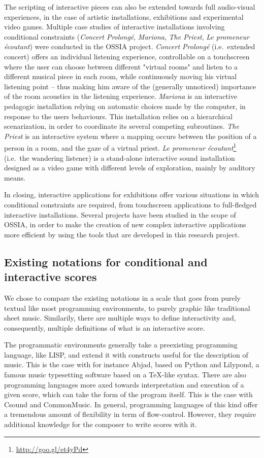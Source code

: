 \documentclass{article}
\begin{document}
	The scripting of interactive pieces can also be extended towards full audio-visual experiences, in the case of artistic installations, exhibitions and  experimental video games.
	Multiple case studies of interactive installations involving conditional constraints (\emph{Concert Prolongé}, \emph{Mariona}, \emph{The Priest}, \emph{Le promeneur écoutant}) were conducted in the OSSIA pro\-ject.
	\emph{Concert Prolongé} (i.e.~extended concert) offers an individual listening experience, controllable on a touchscreen where the user can choose between different "virtual rooms" and listen to a different musical piece in each room, while continuously moving his virtual listening point -- thus making him aware of the (generally unnoticed) importance of the room acoustics in the listening experience.
	\emph{Mariona}\cite[section 7.5.3]{mauricio2012structured} is an interactive pedagogic installation relying on automatic choices made by the computer, in response to the users behaviours. This installation relies on a hier\-archical scenarization, in order to coordinate its several competing subroutines.
	\emph{The Priest} is an interactive system where a mapping occurs between the position of a person in a room, and the gaze of a virtual priest.
	\emph{Le promeneur écoutant}\footnote{\href{http://goo.gl/et4yPd}{http://goo.gl/et4yPd}} (i.e.~the wandering listener) is a stand-alone interactive sound installation designed as a video game with different levels of exploration, mainly by auditory means.
	
	In closing, interactive applications for exhibitions offer various situations in which conditional constraints are required, from touchscreen applications to full-fledged interactive installations. Several projects have been studied in the scope of OSSIA, in order to make the creation of new complex interactive applications more efficient by using the tools that are developed in this research project.
	\subsection{Existing notations for conditional and interactive scores}
	We chose to compare the existing notations in a scale that goes from purely textual like most programming environments, to purely graphic like traditional sheet music. Similarily, there are multiple ways to define interactivity and, consequently, multiple definitions of what is an interactive score.
	
    The programmatic environments generally take a preexisting programming language, like LISP, and extend it with constructs useful for the description of music. This is the case with for instance Abjad\cite{adan2011abjad}, based on Python and Lilypond, a famous music typesetting software based on a \TeX-like syntax. 
    There are also programming languages more axed towards interpretation and execution of a given score, which can take the form of the program itself. This is the case with Csound and CommonMusic\cite{taube1997introduction}. In general, programming languages of this kind offer a tremendous amount of flexibility in term of flow-control. However, they require additional knowledge for the composer to write scores with it.
    
\end{document}
